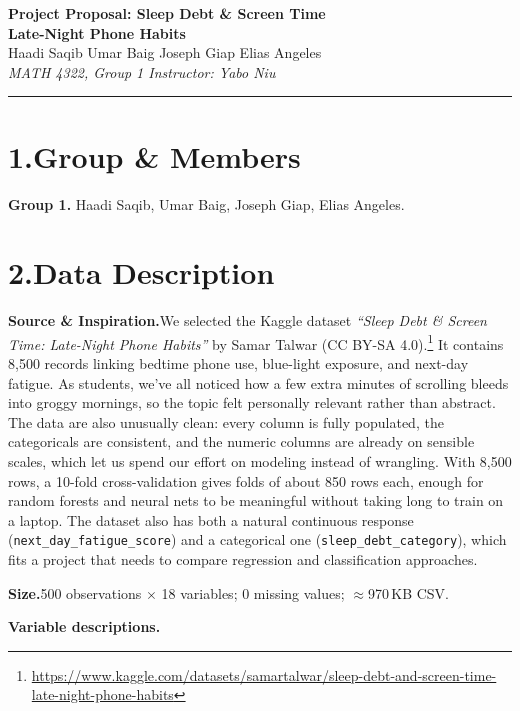 \documentclass[10pt]{article}
\begin{document}
\begin{center}
{\Large \textbf{Project Proposal: Sleep Debt \& Screen Time}}\\[4pt]
{\Large \textbf{Late-Night Phone Habits}}\\[8pt]
{\normalsize Haadi Saqib \quad Umar Baig \quad Joseph Giap \quad Elias Angeles}\\[4pt]
{\small \textit{MATH 4322, Group 1 \quad Instructor: Yabo Niu}}
\end{center}

\vspace{0.15in}
\hrule
\vspace{0.15in}

\section*{1.\quad Group \& Members}
\textbf{Group 1.} Haadi Saqib, Umar Baig, Joseph Giap, Elias Angeles.

\section*{2.\quad Data Description}

\textbf{Source \& Inspiration.}\quad We selected the Kaggle dataset \emph{``Sleep Debt \& Screen Time: Late-Night Phone Habits''} by Samar Talwar (CC BY-SA 4.0).\footnote{\url{https://www.kaggle.com/datasets/samartalwar/sleep-debt-and-screen-time-late-night-phone-habits}}
It contains 8{,}500 records linking bedtime phone use, blue-light exposure, and next-day fatigue.
As students, we've all noticed how a few extra minutes of scrolling bleeds into groggy mornings, so the topic felt personally relevant rather than abstract.
The data are also unusually clean: every column is fully populated, the categoricals are consistent, and the numeric columns are already on sensible scales, which let us spend our effort on modeling instead of wrangling.
With 8{,}500 rows, a 10-fold cross-validation gives folds of about 850 rows each, enough for random forests and neural nets to be meaningful without taking long to train on a laptop.
The dataset also has both a natural continuous response (\texttt{next\_day\_fatigue\_score}) and a categorical one (\texttt{sleep\_debt\_category}), which fits a project that needs to compare regression and classification approaches.

\textbf{Size.}500 observations $\times$ 18 variables; 0 missing values; $\approx$970\,KB CSV.

\textbf{Variable descriptions.}
\end{document}
